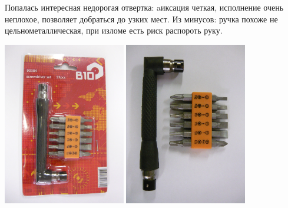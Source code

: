 
Попалась интересная недорогая отвертка: aиксация четкая, исполнение очень
неплохое, позволяет добраться до узких мест. Из минусов: ручка похоже не
цельнометаллическая, при изломе есть риск распороть руку.

\bigskip
\noindent\includegraphics[width=0.4\textwidth]{tech/tools/P1020966.jpg}
\noindent\includegraphics[width=0.4\textwidth]{tech/tools/P1020967.jpg}
\clearpage

\secup

